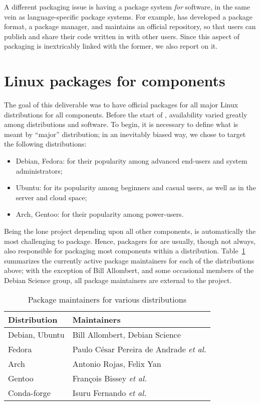 \documentclass{deliverablereport}
\begin{document}
A different packaging issue is having a package system \emph{for}
\ODK software, in the same vein as language-specific package
systems. %
For example, \GAP has developed a package format, a package manager,
and maintains an official repository, so that users can publish and
share their code written in \GAP with other users. %
Since this aspect of packaging is inextricably linked with the former,
we also report on it.


\section{Linux packages for \ODK components}

The goal of this deliverable was to have official packages for all
major Linux distributions for all \ODK components. %
Before the start of \ODK, availability varied greatly among
distributions and software. %
To begin, it is necessary to define what is meant by ``major''
distribution; in an inevitably biased way, we chose to target the
following distributions:

\begin{itemize}
\item Debian, Fedora: for their popularity among advanced end-users
  and system administrators;
\item Ubuntu: for its popularity among beginners and casual users, as well as
  in the server and cloud space;
\item Arch, Gentoo: for their popularity among power-users.
\end{itemize}

Being the lone project depending upon all other \ODK components, \Sage
is automatically the most challenging to package. %
Hence, packagers for \Sage are usually, though not always, also
responsible for packaging most \ODK components within a
distribution. %
Table~\ref{tab:maintainers} summarizes the currently active package
maintainers for each of the distributions above; with the exception of
Bill Allombert, and some occasional members of the Debian Science
group, all package maintainers are external to the \ODK project.

\begin{table}
  \centering
  \begin{tabular}{p{} | p{}}
    Distribution & Maintainers\\
    \hline
    Debian, Ubuntu & Bill Allombert, Debian Science\\
    Fedora & Paulo César Pereira de Andrade \emph{et al.}\\
    Arch & Antonio Rojas, Felix Yan\\
    Gentoo & François Bissey \emph{et al.}\\
    Conda-forge & Isuru Fernando \emph{et al.}
  \end{tabular}
  \caption{Package maintainers for various distributions}
  \label{tab:maintainers}
\end{table}
\end{document}

